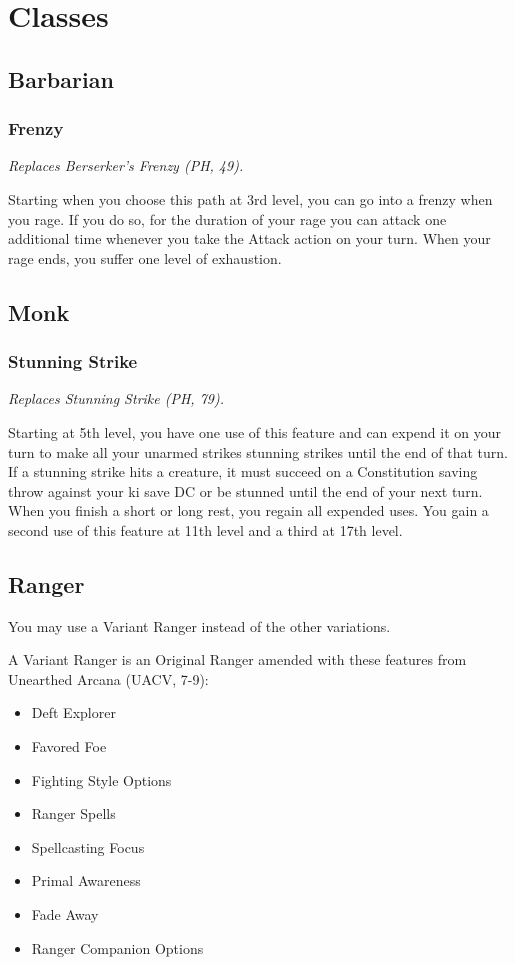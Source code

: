 \documentclass[House_Rules.tex]{subfiles}
\begin{document}
\section{Classes}

\subsection{Barbarian}

\subsubsection{Frenzy}
\textit{Replaces Berserker's Frenzy (PH, 49).}

Starting when you choose this path at 3rd level, you can go into a frenzy when you rage. If you do so, for the duration of your rage you can attack one additional time whenever you take the Attack action on your turn. When your rage ends, you suffer one level of exhaustion.

\subsection{Monk}
\subsubsection{Stunning Strike}
\textit{Replaces Stunning Strike (PH, 79).}

Starting at 5th level, you have one use of this feature and can expend it on your turn to make all your unarmed strikes stunning strikes until the end of that turn. If a stunning strike hits a creature, it must succeed on a Constitution saving throw against your ki save DC or be stunned until the end of your next turn. When you finish a short or long rest, you regain all expended uses. You gain a second use of this feature at 11th level and a third at 17th level. 

\subsection{Ranger}
You may use a Variant Ranger instead of the other variations.

A Variant Ranger is an Original Ranger amended with these features from Unearthed Arcana (UACV, 7-9):

\begin{itemize}
    \item Deft Explorer
    \item Favored Foe
    \item Fighting Style Options
    \item Ranger Spells
    \item Spellcasting Focus
    \item Primal Awareness
    \item Fade Away
    \item Ranger Companion Options
\end{itemize}
\end{document}
